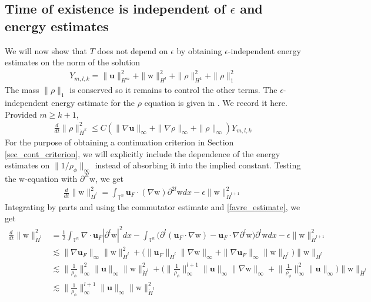 \documentclass[11pt,letterpaper]{amsart}
\theoremstyle{plain}
\theoremstyle{definition}
\theoremstyle{remark}
\newcommand{\T}{\ensuremath{\mathbb{T}}}   %
\renewcommand{\geq}{\geqslant}
\renewcommand{\leq}{\leqslant}
\def\T{\mathbb{T}}
\def\Hldot{\dot{H}^l}
\def\Hkdot{\dot{H}^k}
\def\u{\textbf{u}}
\def \wt {\mathrm{w}}
\begin{document}
\subsection{Time of existence is independent of $\epsilon$ and energy estimates}
\label{energy_estimates}
We will now show that $T$ does not depend on $\epsilon$ by obtaining 
$\epsilon$-independent energy estimates on the norm of the solution 
\begin{align*}
    Y_{m,l,k} = \|\u\|_{H^m}^2 + \| \wt \|_{H^l}^2 + \|\rho\|_{H^k}^2 + \|\rho\|_1^2
\end{align*}
The mass $\|\rho\|_1$ is conserved so it remains to control the other terms. 
The $\epsilon$-independent energy estimate for the $\rho$ equation is given in \cite{Sbook}. 
We record it here. Provided $m \geq k+1$,
\begin{align*}
    \frac{d}{dt} \|\rho\|_{\Hkdot}^2 \leq C (\|\nabla \u\|_{\infty} + \|\nabla \rho\|_{\infty} + \|\rho\|_{\infty}) Y_{m,l,k}
\end{align*}
For the purpose of obtaining a continuation criterion in Section \ref{sec_cont_criterion}, we will explicitly include the dependence of the energy estimates on $\|1/\rho_{\phi}\|_{\infty}$ 
instead of absorbing it into the implied constant. 
Testing the $\wt$-equation with $\partial^{2l} \wt$, we get 
\begin{align*}
    \frac{d}{dt} \| \wt \|_{\Hldot}^2 = \int_{\T^n} \u_F \cdot (\nabla \wt) \partial^{2l} \wt dx - \epsilon \| \wt \|_{\dot{H}^{l+1}}^2
\end{align*}
Integrating by parts and using the commutator estimate and \ref{favre_estimate}, we get 
\begin{align*}
    \frac{d}{dt} \| \wt \|_{\Hldot}^2  
        &= \frac{1}{2} \int_{\T^n} \nabla \cdot \u_F |\partial^l \wt|^2 dx   
            - \int_{\T^n} \Big( \partial^l ( \u_F \cdot \nabla \wt ) - \u_F \cdot \nabla \partial^l \wt \Big) \partial^l \wt dx 
            - \epsilon \| \wt \|_{\dot{H}^{l+1}}^2 \\
        &\lesssim \|\nabla \u_F\|_{\infty} \| \wt \|_{\Hldot}^2   
            + \big( \|\u_F\|_{\Hldot} \|\nabla \wt\|_{\infty} + \|\nabla \u_F\|_{\infty} \| \wt \|_{\Hldot} \big) \| \wt \|_{\Hldot} \\
        &\lesssim \Big\| \frac{1}{\rho_{\phi}} \Big\|_{\infty}^2 \|\u\|_{\infty} \| \wt \|_{\Hldot}^2    
            + \Big( \Big\| \frac{1}{\rho_{\phi}} \Big\|_{\infty}^{l+1} \|\u\|_{\infty} \|\nabla \wt\|_{\infty} 
            + \Big\| \frac{1}{\rho_{\phi}} \Big\|_{\infty}^2 \|\u\|_{\infty} \Big) \| \wt \|_{\Hldot} \\
        &\lesssim \Big\| \frac{1}{\rho_{\phi}} \Big\|_{\infty}^{l+1} \|\u\|_{\infty} \| \wt \|_{\Hldot}^2    
\end{align*}
\end{document}
